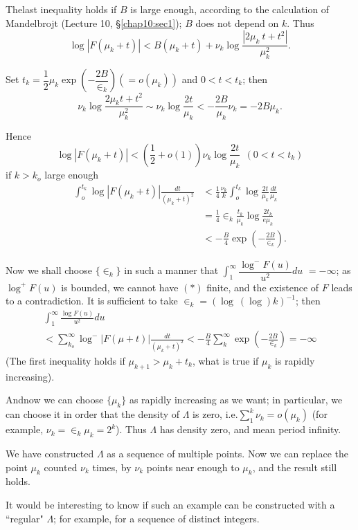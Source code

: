 The\pageoriginale last inequality holds if $B$ is large enough, according to the
calculation of Mandelbrojt (Lecture 10, \S \ref{chap10:sec1}); $B$ does not depend
on $k$. Thus 
$$
\log | F(\mu_k + t) | < B(\mu_k +t)+ \nu_k \log \frac{| 2 \mu_k ~ t +
 t^2 |}{\mu^2_k}. 
$$

Set $t_k=\dfrac{1}{2} \mu_k \exp \left(- \dfrac{2B}{\in_k}\right)
(=o(\mu_k))$ and $0 <t < t_k$; then 
$$
\nu_k \log \frac{2 \mu_k t +t^2}{\mu_k^2} \sim \nu_k \log
\frac{2t}{\mu_k} < -\frac{2B}{\mu_k} \nu_k =-2B \mu_k. 
$$

Hence
$$
\log|F(\mu_k +t)| < (\frac{1}{2}+ o(1)) \nu_k \log \frac{2t}{\mu_k} ~~
(0<t<t_k) 
$$
if $k>k_o$ large enough
\begin{align*}
 \int^{t_k}_o \log |F(\mu_k + t)| \frac{dt}{(\mu_k+t)^2} & <
 \frac{1}{4} \frac{\nu_k}{k} \int^{t_k}_{o} \log \frac{2t}{\mu_k}
 \frac{dt}{\mu_k}\\ 
 & = \frac{1}{4} \in_k \frac{t_k}{\mu_k} \log \frac{2t_k}{e \mu_k}\\
 & < - \frac{B}{4} \exp \left(- \frac{2B}{\in_k}\right).
\end{align*}

Now we shall choose $\{ \in_k\}$ in such a manner that
$\int^\infty_1 \dfrac{\log^{-}F(u)}{u^2} du$ $= -\infty$; as $\log^{+}
F(u)$ is bounded, we cannot have $(*)$ finite, and the existence of
$F$ leads to a contradiction. It is sufficient to take $\in_k
= (\log ~ (\log)k)^{-1}$; then 
\begin{multline*}
 \int^\infty_1 \frac{\log F(u)}{u^2}du\\ 
 < \sum^\infty_{k_o} \log^{-} |
 F(\mu +t)| \frac{dt}{(\mu_k +t)^2} < - \frac{B}{4} \sum^\infty_k \exp
 \left(-\frac{2B}{\in_k}\right) =-\infty 
\end{multline*}
(The first inequality holds if $\mu_{k+1} > \mu_k + t_k$, what is true
if $\mu_k$ is rapidly increasing). 

And\pageoriginale now we can choose $\{ \mu_k\}$ as rapidly increasing as we want;
in particular, we can choose it in order that the density of $\Lambda$
is zero, i.e.$ \sum^k_1 \nu_k = o (\mu_k)$ (for example, $ \nu_k =
\in_k \mu_k =2^k$). 
Thus $\Lambda$ has density zero, and mean period infinity. 

We have constructed $\Lambda$ as a sequence of multiple points. Now we
can replace the point $\mu_k$ counted $\nu_k$ times, by $\nu_k$ points
near enough to $\mu_k$, and the result still holds. 

It would be interesting to know if such an example can be constructed
with a ``regular" $\Lambda$; for example, for a sequence of distinct
integers. 


